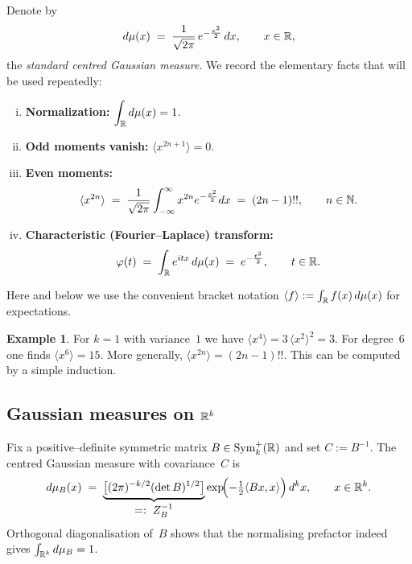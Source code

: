 \documentclass[letterpaper,11pt,oneside,reqno]{article}
\numberwithin{equation}{section}
\theoremstyle{definition}
\newtheorem{example}[proposition]{Example}
\begin{document}
Denote by
\[
  d\mu(x)\;=\;\frac{1}{\sqrt{2\pi}}\,
               e^{-\frac{x^{2}}{2}}\,dx,
  \qquad x\in\Bbb R,
\]
the \emph{standard centred Gaussian measure}.
We record the elementary facts that will be used repeatedly:

\begin{enumerate}[(i)]
  \item \textbf{Normalization:}
        $\displaystyle\int_{\Bbb R}d\mu(x)=1$.

  \item \textbf{Odd moments vanish:}
        $\langle x^{2n+1}\rangle=0$.

  \item \textbf{Even moments:}
        \[
          \langle x^{2n}\rangle
          \;=\;
          \frac{1}{\sqrt{2\pi}}
          \int_{-\infty}^{\infty}
            x^{2n}e^{-\frac{x^{2}}{2}}dx
          \;=\;(2n-1)!!,
          \qquad n\in\Bbb N.
        \]

  \item \textbf{Characteristic (Fourier–Laplace) transform:}
        \[
          \varphi(t)
          \;=\;
          \int_{\Bbb R}e^{itx}\,d\mu(x)
          \;=\;
          e^{-\frac{t^{2}}{2}},
          \qquad t\in\Bbb R.
        \]
\end{enumerate}
Here and below we use the convenient bracket notation
\(
  \langle f\rangle:=\int_{\Bbb R}f(x)\,d\mu(x)
\)
for expectations.



\begin{example}
\label{ex:x4}
For $k=1$ with variance~$1$ we have
\(
  \langle x^{4}\rangle
  = 3\,\langle x^{2}\rangle^{2}=3.
\)
For degree $6$ one finds
\(
  \langle x^{6}\rangle = 15.
\)
More generally,
$\langle x^{2n}\rangle=(2n-1)!!$.
This can be computed by a simple induction.
\end{example}



\subsection{Gaussian measures on \texorpdfstring{$\Bbb R^{k}$}{Rk}}
\label{subsec:multivariate-gaussian}

Fix a positive–definite symmetric matrix
$B\in\operatorname{Sym}_{k}^{+}(\Bbb R)$ and set
$C:=B^{-1}$.
The centred Gaussian measure with covariance~$C$ is
\begin{equation}
  d\mu_{B}(x)
  \;=\;
  \underbrace{\bigl[(2\pi)^{-k/2}(\det B)^{1/2}\bigr]}_{\displaystyle =:\;Z_{B}^{-1}}
  \exp\!\Bigl(-\tfrac12\langle Bx,x\rangle\Bigr)\,d^{k}x,
  \qquad x\in\Bbb R^{k}.
  \label{eq:multivariate-gaussian-density}
\end{equation}
Orthogonal diagonalisation of~$B$ shows that the normalising
prefactor indeed gives $\int_{\Bbb R^{k}}d\mu_{B}=1$.
\end{document}
